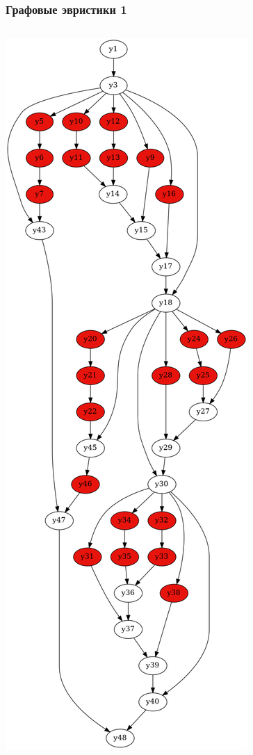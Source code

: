 \documentclass{beamer}
\begin{document}
\graphicspath{ {images/} }
\begin{frame}\frametitle{Графовые эвристики 1}
\begin{columns}
\includegraphics[width=\textwidth]{hash2if1.png}

\end{columns}
\end{frame}
\end{document}

